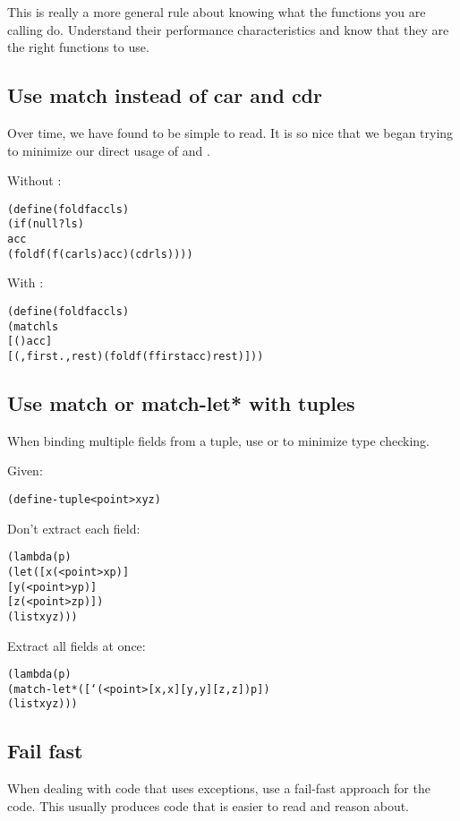 \documentclass[letterpaper,11pt,twoside,final]{article}
\begin{document}
This is really a more general rule about knowing what the functions
you are calling do. Understand their performance characteristics and
know that they are the right functions to use.

\subsection* {Use match instead of car and cdr}

Over time, we have found  to be simple to read. It is
so nice that we began trying to minimize our direct usage of
 and .

Without :
\antipar
\begin{alltt}
(define (fold f acc ls)
  (if (null? ls)
      acc
      (fold f (f (car ls) acc) (cdr ls))))
\end{alltt}

With :
\antipar
\begin{alltt}
(define (fold f acc ls)
  (match ls
    [() acc]
    [(,first . ,rest) (fold f (f first acc) rest)]))
\end{alltt}

\subsection* {Use match or match-let* with tuples}

When binding multiple fields from a tuple, use  or
 to minimize type checking.

Given:
\antipar
\begin{alltt}
(define-tuple <point> x y z)
\end{alltt}

Don't extract each field:
\antipar
\begin{alltt}
(lambda (p)
  (let ([x (<point> x p)]
        [y (<point> y p)]
        [z (<point> z p)])
    (list x y z)))
\end{alltt}

Extract all fields at once:
\antipar
\begin{alltt}
(lambda (p)
  (match-let* ([`(<point> [x ,x] [y ,y] [z ,z]) p])
    (list x y z)))
\end{alltt}

\subsection* {Fail fast}

When dealing with code that uses exceptions, use a fail-fast approach
for the code. This usually produces code that is easier to read and
reason about.
\end{document}
